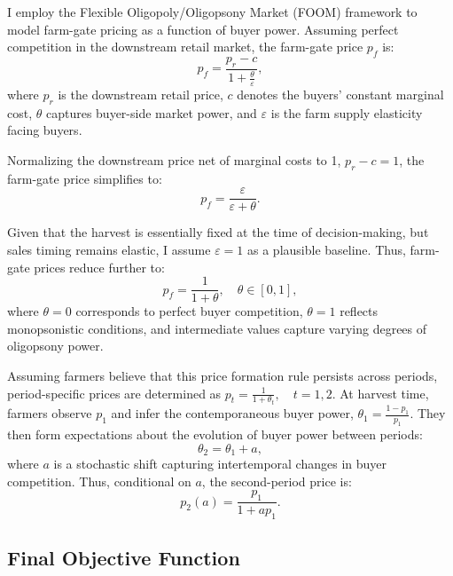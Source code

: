 I employ the Flexible Oligopoly/Oligopsony Market (FOOM) framework to model farm-gate pricing as a function of buyer power. Assuming perfect competition in the downstream retail market, the farm-gate price $p_f$ is:
\begin{equation}
p_f = \frac{p_r - c}{1 + \frac{\theta}{\varepsilon}},
\end{equation}
where $p_r$ is the downstream retail price, $c$ denotes the buyers' constant marginal cost, $\theta$ captures buyer-side market power, and $\varepsilon$ is the farm supply elasticity facing buyers.

Normalizing the downstream price net of marginal costs to 1, $p_r - c = 1$, the farm-gate price simplifies to:
\begin{equation}
p_f = \frac{\varepsilon}{\varepsilon + \theta}.
\end{equation}

Given that the harvest is essentially fixed at the time of decision-making, but sales timing remains elastic, I assume $\varepsilon = 1$ as a plausible baseline. Thus, farm-gate prices reduce further to:
\begin{equation}
p_f = \frac{1}{1+\theta}, \quad \theta \in [0,1],
\label{Eq: price formation by buyer power}
\end{equation}
where $\theta=0$ corresponds to perfect buyer competition, $\theta=1$ reflects monopsonistic conditions, and intermediate values capture varying degrees of oligopsony power.

Assuming farmers believe that this price formation rule persists across periods, period-specific prices are determined as $p_t = \frac{1}{1+\theta_t}, \quad t=1,2$. At harvest time, farmers observe $p_1$ and infer the contemporaneous buyer power, $\theta_1 = \frac{1 - p_1}{p_1}$. They then form expectations about the evolution of buyer power between periods:
\begin{equation}
\theta_2 = \theta_1 + a,
\end{equation}
where $a$ is a stochastic shift capturing intertemporal changes in buyer competition.  
Thus, conditional on $a$, the second-period price is:
\begin{equation}
p_2(a) = \frac{p_1}{1 + a p_1}.
\label{Eq: p_2 of buyer power change}
\end{equation}

\subsection{Final Objective Function}

